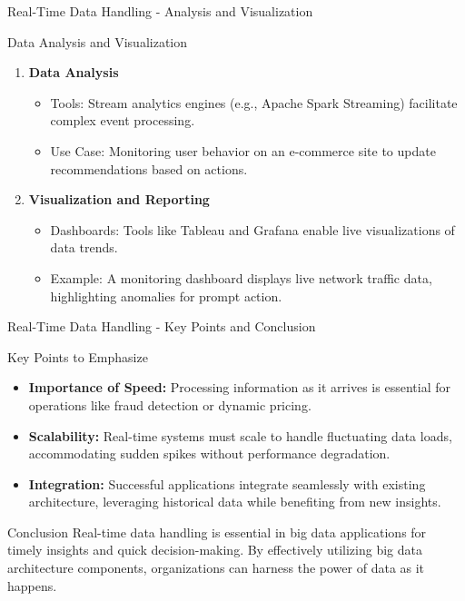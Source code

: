 \documentclass[aspectratio=169]{beamer}
\begin{document}
\begin{frame}[fragile]{Real-Time Data Handling - Analysis and Visualization}
  \begin{block}{Data Analysis and Visualization}
    \begin{enumerate}
      \item \textbf{Data Analysis}
        \begin{itemize}
          \item Tools: Stream analytics engines (e.g., Apache Spark Streaming) facilitate complex event processing.
          \item Use Case: Monitoring user behavior on an e-commerce site to update recommendations based on actions.
        \end{itemize}

      \item \textbf{Visualization and Reporting}
        \begin{itemize}
          \item Dashboards: Tools like Tableau and Grafana enable live visualizations of data trends.
          \item Example: A monitoring dashboard displays live network traffic data, highlighting anomalies for prompt action.
        \end{itemize}
    \end{enumerate}
  \end{block}
\end{frame}

\begin{frame}[fragile]{Real-Time Data Handling - Key Points and Conclusion}
  \begin{block}{Key Points to Emphasize}
    \begin{itemize}
      \item \textbf{Importance of Speed:} Processing information as it arrives is essential for operations like fraud detection or dynamic pricing.
      \item \textbf{Scalability:} Real-time systems must scale to handle fluctuating data loads, accommodating sudden spikes without performance degradation.
      \item \textbf{Integration:} Successful applications integrate seamlessly with existing architecture, leveraging historical data while benefiting from new insights.
    \end{itemize}
  \end{block}

  \begin{block}{Conclusion}
    Real-time data handling is essential in big data applications for timely insights and quick decision-making. By effectively utilizing big data architecture components, organizations can harness the power of data as it happens.
  \end{block}
\end{frame}
\end{document}
